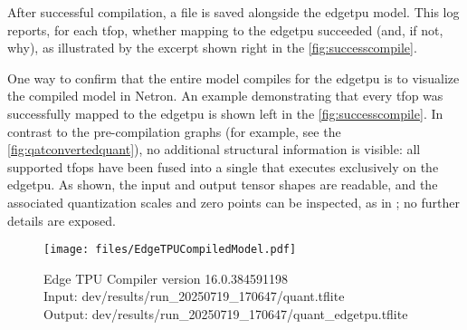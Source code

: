 {After successful compilation, a  file is saved alongside the \gls{edgetpu} model.
This log reports, for each \gls{tfop}, whether mapping to the \gls{edgetpu} succeeded (and, if not, why),
as illustrated by the  excerpt shown right in the \autoref{fig:successcompile}.

One way to confirm that the entire model compiles for the \gls{edgetpu} is to visualize the compiled model in Netron.
An example demonstrating that every \gls{tfop} was successfully mapped to the \gls{edgetpu} is shown left in the \autoref{fig:successcompile}.
In contrast to the pre-compilation graphs (for example, see the \autoref{fig:qatconvertedquant}), no additional structural information is visible:
all supported \glspl{tfop} have been fused into a single  that executes exclusively on the \gls{edgetpu}.
As shown, the input and output tensor shapes are readable, and the associated quantization scales and zero points can be inspected,
as in ; no further details are exposed.

\begin{figure}[htbp]
\begin{minipage}[t]{0.26\textwidth}\vspace{0pt} %
    \centering
    \texttt{[image: files/EdgeTPUCompiledModel.pdf]}
\end{minipage}%
\hspace{0.5cm plus 1fill} %
\begin{minipage}[t]{0.74\textwidth}\vspace{0pt}
    \vspace*{\fill}        %
    \raggedright           %
    \small

    Edge TPU Compiler version 16.0.384591198\\
    Input: dev/results/run\_20250719\_170647/quant.tflite\\
    Output: dev/results/run\_20250719\_170647/quant\_edgetpu.tflite\\


\end{minipage}
\end{figure}}
